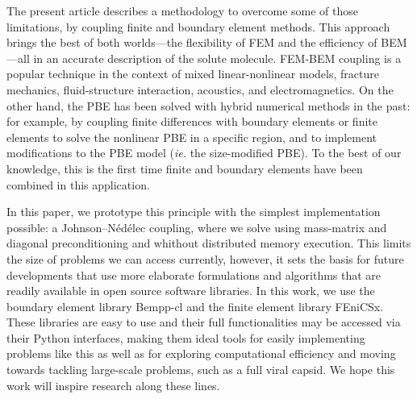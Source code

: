 The present article describes a methodology to overcome some of those limitations, by coupling finite and boundary element methods.
This approach brings the best of both worlds---the flexibility of FEM and the efficiency of BEM---all in an accurate description of the solute molecule.
FEM-BEM coupling is a popular technique in the context of mixed linear-nonlinear models,\cite{carstensen1995coupling,aurada2013classical} fracture mechanics,\cite{aour2007coupled} fluid-structure interaction,\cite{estorff1991fem} acoustics,\cite{hiptmair2006stabilized} and electromagnetics.\cite{matsuoka1988calculation,hiptmair2008stabilized,bruckner20123d}
On the other hand, the PBE has been solved with hybrid numerical methods in the past: for example, by coupling finite differences with boundary elements\cite{boschitsch2004hybrid} or finite elements\cite{xie2016new,ying2018hybrid} to solve the nonlinear PBE in a specific region, and to implement modifications to the PBE model ({\it ie.} the size-modified PBE).
To the best of our knowledge, this is the first time finite and boundary elements have been combined in this application.

In this paper, we prototype this principle with the simplest implementation possible: a Johnson--N\'ed\'elec\cite{johnson1980coupling} coupling, where we solve using mass-matrix and diagonal preconditioning and whithout distributed memory execution.
This limits the size of problems we can access currently, however, it sets the basis for future developments that use more elaborate formulations and algorithms that are readily available in open source software libraries.
In this work, we use the boundary element library Bempp-cl\cite{BetckeScroggs2021} and the finite element library FEniCSx\cite{BasixJoss,BasixDofTransformations,FEniCS}.
These libraries are easy to use and their full functionalities may be accessed via their Python interfaces, making them ideal tools for easily implementing problems like this as well as for exploring computational efficiency and moving towards tackling large-scale problems, such as a full viral capsid.\cite{MartinezETal2019,wang2021high}
We hope this work will inspire research along these lines.
